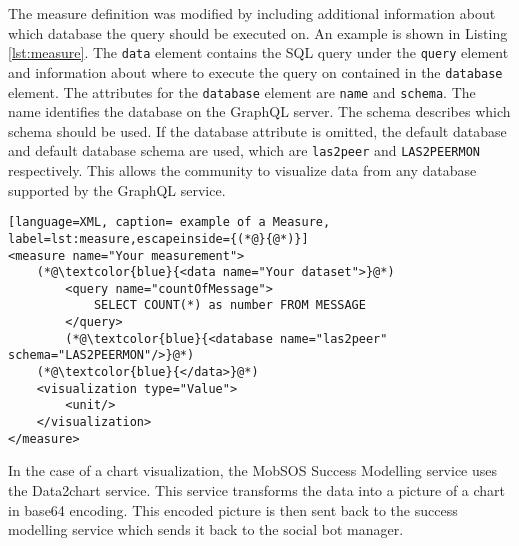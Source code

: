 The measure definition was modified by including additional information about which database the query should be executed on. 
An example is shown in Listing \ref{lst:measure}.
The \texttt{data} element contains the SQL query under the \texttt{query} element and information about where to execute the query on contained in the \texttt{database} element.
The attributes for the \texttt{database} element are \texttt{name} and \texttt{schema}. The name identifies the database on the GraphQL server. 
The schema describes which schema should be used.
If the database attribute is omitted, the default database and default database schema are used, which are \texttt{las2peer} and \texttt{LAS2PEERMON} respectively.
This allows the community to visualize data from any database supported by the GraphQL service.

\begin{lstlisting}[language=XML, caption= example of a Measure, label=lst:measure,escapeinside={(*@}{@*)}]
<measure name="Your measurement">
    (*@\textcolor{blue}{<data name="Your dataset">}@*)   
        <query name="countOfMessage">
            SELECT COUNT(*) as number FROM MESSAGE
        </query>
        (*@\textcolor{blue}{<database name="las2peer" schema="LAS2PEERMON"/>}@*)
    (*@\textcolor{blue}{</data>}@*)
    <visualization type="Value">
        <unit/>
    </visualization>
</measure>
\end{lstlisting}

In the case of a chart visualization, the MobSOS Success Modelling service uses the Data2chart service. This service transforms the data into a picture of a chart in base64 encoding. This encoded picture is then sent back to the success modelling service which sends it back to the social bot manager.

